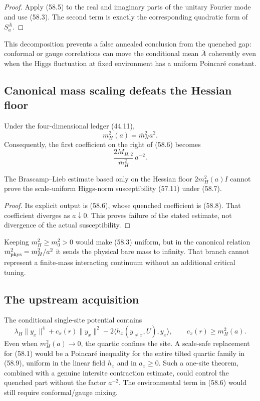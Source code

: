 \documentclass[11pt]{article}
\theoremstyle{remark}
\begin{document}
\begin{proof}
Apply (58.5) to the real and imaginary parts of the unitary Fourier
mode and use (58.3).  The second term is exactly the corresponding
quadratic form of \(S_a^{\bar A}\).
\end{proof}

This decomposition prevents a false annealed conclusion from the
quenched gap: conformal or gauge correlations can move the conditional
mean \(\bar A\) coherently even when the Higgs fluctuation at fixed
environment has a uniform Poincar\'e constant.

\subsection{Canonical mass scaling defeats the Hessian floor}

Under the four-dimensional ledger (44.11),
\[
 m_H^2(a)=\bar m_H^2a^2.                           \tag{58.7}
\]
Consequently, the first coefficient on the right of (58.6) becomes
\[
 \frac{2M_{H,2}}{\bar m_H^2}\,a^{-2}.             \tag{58.8}
\]

\begin{countertheorem}
\label{ctr:v17v58-mass}
The Brascamp--Lieb estimate based only on the Hessian floor
\(2m_H^2(a)I\) cannot prove the scale-uniform Higgs-norm
susceptibility (57.11) under (58.7).
\end{countertheorem}

\begin{proof}
Its explicit output is (58.6), whose quenched coefficient is (58.8).
That coefficient diverges as \(a\downarrow0\).  This proves failure of
the stated estimate, not divergence of the actual susceptibility.
\end{proof}

Keeping \(m_H^2\geq m_0^2>0\) would make (58.3) uniform, but in the
canonical relation \(m_{\rm phys}^2=m_H^2/a^2\) it sends the physical
bare mass to infinity.  That branch cannot represent a finite-mass
interacting continuum without an additional critical tuning.

\subsection{The upstream acquisition}

The conditional single-site potential contains
\[
 \lambda_H\|y_x\|^4+c_x(r)\|y_x\|^2
 -2\langle h_x(y_{\ne x},U),y_x\rangle,
 \qquad c_x(r)\geq m_H^2(a).                      \tag{58.9}
\]
Even when \(m_H^2(a)\to0\), the quartic confines the site.  A
scale-safe replacement for (58.1) would be a Poincar\'e inequality
for the entire tilted quartic family in (58.9), uniform in the linear
field \(h_x\) and in \(a_x\geq0\).  Such a one-site theorem, combined
with a genuine intersite contraction estimate, could control the
quenched part without the factor \(a^{-2}\).  The environmental term
in (58.6) would still require conformal/gauge mixing.
\end{document}
